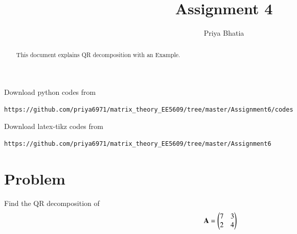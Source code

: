 \documentclass[journal,12pt,twocolumn]{IEEEtran}
\begin{document}
     \def\rightbox#1{\makebox[0in][r]{#1}}
     \def\centbox#1{\makebox[0in]{#1}}
     \def\topbox#1{\raisebox{-\baselineskip}[0in][0in]{#1}}
     \def\midbox#1{\raisebox{-0.5\baselineskip}[0in][0in]{#1}}
\vspace{3cm}
\title{Assignment 4}
\author{Priya Bhatia}
\maketitle
\newpage
\bigskip
\renewcommand{\thefigure}{\theenumi}
\renewcommand{\thetable}{\theenumi}
\begin{abstract}
This document explains QR decomposition with an Example.
\end{abstract}
%
Download python codes from 
%
\begin{lstlisting}
https://github.com/priya6971/matrix_theory_EE5609/tree/master/Assignment6/codes
\end{lstlisting}
%
%
Download latex-tikz codes from 
%
\begin{lstlisting}
https://github.com/priya6971/matrix_theory_EE5609/tree/master/Assignment6
\end{lstlisting}
%
\section{\textbf{Problem}}
Find the QR decomposition of 
\begin{align}
    \mathbf{A} &= \begin{pmatrix}7 & 3 \\ 2 & 4\end{pmatrix} 
\end{align}
\end{document}

